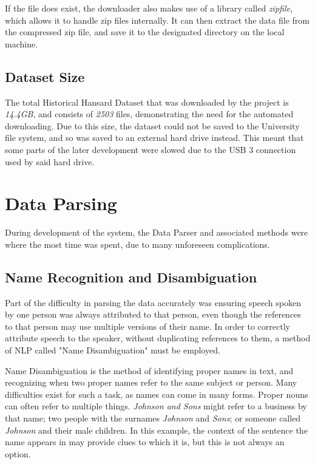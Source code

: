 If the file does exist, the downloader also makes use of a library called \emph{zipfile}, which allows it to handle zip files internally. It can then extract the data file from the compressed zip file, and save it to the designated directory on the local machine.

\subsection{Dataset Size}
\label{sec:imp_dataset_size}

The total Historical Hansard Dataset that was downloaded by the project is \emph{14.4GB}, and consists of \emph{2503} files, demonstrating the need for the automated downloading. Due to this size, the dataset could not be saved to the University file system, and so was saved to an external hard drive instead. This meant that some parts of the later development were slowed due to the USB 3 connection used by said hard drive. 

\section{Data Parsing}
\label{sec:imp_data_parse}
During development of the system, the Data Parser and associated methods were where the most time was spent, due to many unforeseen complications.
 
\subsection{Name Recognition and Disambiguation}
\label{sec:imp_name_disamb}
Part of the difficulty in parsing the data accurately was ensuring speech spoken by one person was always attributed to that person, even though the references to that person may use multiple versions of their name. In order to correctly attribute speech to the speaker, without duplicating references to them, a method of NLP called "Name Disambiguation" must be employed.

Name Disambiguation is the method of identifying proper names in text, and recognizing when two proper names refer to the same subject or person.\cite{Wacholder1997} Many difficulties exist for such a task, as names can come in many forms. Proper nouns can often refer to multiple things. \emph{Johnson and Sons} might refer to a business by that name; two people with the surnames \emph{Johnson} and \emph{Sons}; or someone called \emph{Johnson} and their male children. In this example, the context of the sentence the name appears in may provide clues to which it is, but this is not always an option.


